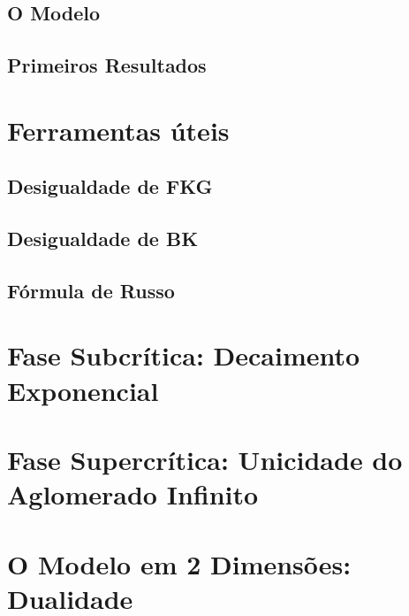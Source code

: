 \documentclass[12pt]{book}
\begin{document}
\section{O Modelo}
\setcounter{equation}{0}
\label{sec:mod}


\section{Primeiros Resultados}
\setcounter{equation}{0}
\label{sec:res}


\chapter{Ferramentas úteis}
\setcounter{equation}{0}
\label{chp:fer}


\section{Desigualdade de FKG}
\setcounter{equation}{0}
\label{sec:fkg}


\section{Desigualdade de BK}
\setcounter{equation}{0}
\label{sec:bk}


\section{Fórmula de Russo}
\setcounter{equation}{0}
\label{sec:rus}


\chapter{Fase Subcrítica: Decaimento Exponencial}
\renewcommand{\theequation}{\thechapter .\arabic{equation}}
\pagestyle{myheadings}
\setcounter{equation}{0}
\label{chp:exp}


\chapter{Fase Supercrítica: Unicidade do Aglomerado Infinito}
\pagestyle{myheadings}
\setcounter{equation}{0}
\label{chp:uni}


\chapter{O Modelo em 2 Dimensões: Dualidade}
\pagestyle{myheadings}
\setcounter{equation}{0}
\label{chp:bid}

\end{document}
